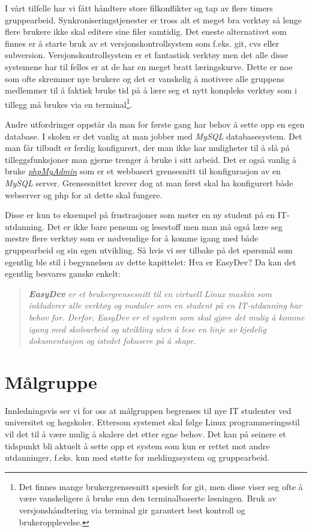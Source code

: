 I vårt tilfelle har vi fått håndtere store filkonflikter og tap av flere timers gruppearbeid. Synkroniseringstjenester er tross alt et meget bra verktøy så lenge flere brukere ikke skal editere sine filer samtidig. Det eneste alternativet som finnes er å starte bruk av et versjonskontrollsystem som f.eks. git, cvs eller subversion. Versjonskontrollsystem er et fantastisk verktøy men det alle disse systemene har til felles er at de har en meget bratt læringskurve. Dette er noe som ofte skremmer nye brukere og det er vanskelig å motivere alle gruppens medlemmer til å faktisk bruke tid på å lære seg et nytt kompleks verktøy som i tillegg må brukes via en terminal\footnote{Det finnes mange brukergrensesnitt spesielt for git, men disse viser seg ofte å være vanskeligere å bruke enn den terminalbaserte løsningen. Bruk av versjonshåndtering via terminal gir garantert best kontroll og brukeropplevelse.}.

Andre utfordringer oppstår da man for første gang har behov å sette opp en egen database. I skolen er det vanlig at man jobber med \textit{MySQL} databasesystem. Det man får tilbudt er ferdig konfigurert, der man ikke har muligheter til å slå på tilleggsfunksjoner man gjerne trenger å bruke i sitt arbeid. Det er også vanlig å bruke \href{http://en.wikipedia.org/wiki/PhpMyAdmin}{\textit{phpMyAdmin}} som er et webbasert grensesnitt til konfigurasjon av en \textit{MySQL} server. Grensesnittet krever dog at man først skal ha konfigurert både webserver og php for at dette skal fungere.

Disse er kun to eksempel på frustrasjoner som møter en ny student på en IT-utdanning. Det er ikke bare pensum og lesestoff men man må også lære seg mestre flere verktøy som er nødvendige for å komme igang med både gruppearbeid og sin egen utvikling. Så hvis vi ser tilbake på det spørsmål som egentlig ble stil i begynnelsen av dette kapittelet: Hva er EasyDev? Da kan det egentlig besvares ganske enkelt: 

\begin{quotation}
\emph{\textbf{EasyDev} er et brukergrensesnitt til en virtuell Linux maskin som inkluderer alle verktøy og moduler som en student på en IT-utdanning har behov for. Derfor, EasyDev er et system som skal gjøre det mulig å komme igang med skolearbeid og utvikling uten å lese en linje av kjedelig dokumentasjon og istedet fokusere på å skape.}
\end{quotation}


\section{Målgruppe} \label{sec:målgruppe}
Innledningsvis ser vi for oss at målgruppen begrenses til nye IT studenter ved universitet og høgskoler. Ettersom systemet skal følge Linux programmeringsstil\cite{book:unixprog} vil det til å være mulig å skalere det etter egne behov. Det kan på seinere et tidspunkt bli aktuelt å sette opp et system som kun er rettet mot andre utdanninger, f.eks. kun med støtte for meldingssystem og gruppearbeid.

